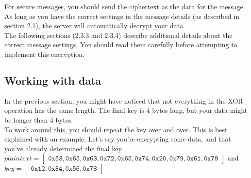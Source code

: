 \documentclass{report}
\newcommand{\code}[1]{\texttt{#1}}
\begin{document}
For secure messages, you should send the ciphertext as the data for the message.
As long as you have the correct settings in the message details (as described in section 2.1), the server will automatically decrypt your data. \\

The following sections (2.3.3 and 2.3.4) describe additional details about the correct message settings. You should read them carefully before attempting to implement this encryption.

\subsection{Working with data}
In the previous section, you might have noticed that not everything in the XOR operation has the same length.
The final key is 4 bytes long, but your data might be longer than 4 bytes. \\

To work around this, you should repeat the key over and over. This is best explained with an example.
Let's say you're encrypting some data, and that you've already determined the final key. \\

$plaintext = \begin{bmatrix}
	\code{0x53}, \code{0x65}, \code{0x63}, \code{0x72}, \code{0x65}, \code{0x74}, \code{0x20}, \code{0x79}, \code{0x61}, \code{0x79}
\end{bmatrix}$ and $key = \begin{bmatrix}
	\code{0x12}, \code{0x34}, \code{0x56}, \code{0x78}
\end{bmatrix}$ \\
\end{document}
